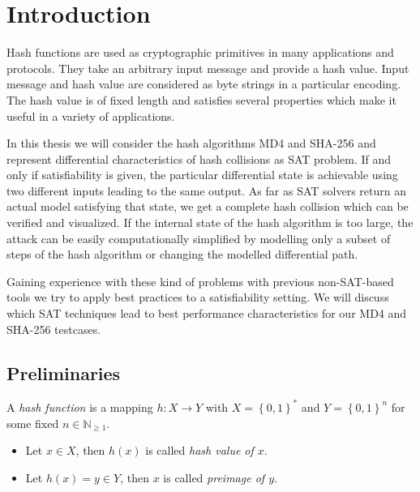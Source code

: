 \renewcommand*\chappic{img/intro.pdf}
\renewcommand*\chapquote{}
\renewcommand*\chapquotesrc{}
\chapter{Introduction}
\label{ch:intro}
%
Hash functions are used as cryptographic primitives in many applications and protocols.
They take an arbitrary input message and provide a hash value. Input message and hash value
are considered as byte strings in a particular encoding.
The hash value is of fixed length and satisfies several properties which make it useful
in a variety of applications.

In this thesis we will consider the hash algorithms MD4 and SHA-256 and represent
differential characteristics of hash collisions as SAT problem. If and only if
satisfiability is given, the particular differential state is achievable
using two different inputs leading to the same output. As far as SAT solvers
return an actual model satisfying that state, we get a complete hash collision
which can be verified and visualized.
If the internal state of the hash algorithm is too large, the attack can be easily
computationally simplified by modelling only a subset of steps of the hash algorithm
or changing the modelled differential path.

Gaining experience with these kind of problems with previous non-SAT-based tools
we try to apply best practices to a satisfiability setting.
We will discuss which SAT techniques lead to best performance characteristics
for our MD4 and SHA-256 testcases.

\newpage  %
\section{Preliminaries}
\label{sec:intro-prelim}
%
\begin{defi}
  A \emph{hash function} is a mapping $h: X \to Y$ with $X = \left\{0,1\right\}^*$ and
  $Y = \left\{0,1\right\}^n$ for some fixed $n \in {\mathbb{N}}_{\geq 1}$.
  \begin{itemize}\itemsep0pt
    \item Let $x \in X$, then $h(x)$ is called \emph{hash value of $x$}.
    \item Let $h(x) = y \in Y$, then $x$ is called \emph{preimage of $y$}.
  \end{itemize}
\end{defi}

